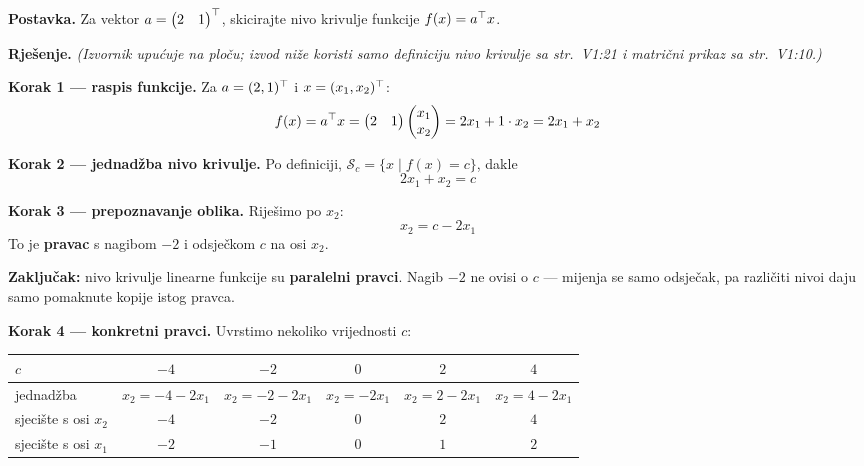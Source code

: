 \begin{zadatak}
\label{zad:nivo-linearna}

\textbf{Postavka.} Za vektor $a = \begin{pmatrix} 2 & 1 \end{pmatrix}^{\top}$,
skicirajte nivo krivulje funkcije $f(x) = a^{\top} x$.

\medskip
\textbf{Rješenje.} \emph{(Izvornik upućuje na ploču; izvod niže koristi samo
definiciju nivo krivulje sa str.\ V1:21 i matrični prikaz sa str.\ V1:10.)}

\textbf{Korak 1 --- raspis funkcije.} Za $a = (2,1)^{\top}$ i $x = (x_1, x_2)^{\top}$:
\[
f(x) = a^{\top} x
= \begin{pmatrix} 2 & 1 \end{pmatrix}\begin{pmatrix} x_1 \\ x_2 \end{pmatrix}
= 2x_1 + 1\cdot x_2 = 2x_1 + x_2
\]

\textbf{Korak 2 --- jednadžba nivo krivulje.} Po definiciji,
$\mathcal{S}_c = \{x \mid f(x) = c\}$, dakle
\[
2x_1 + x_2 = c
\]

\textbf{Korak 3 --- prepoznavanje oblika.} Riješimo po $x_2$:
\[
x_2 = c - 2x_1
\]
To je \textbf{pravac} s nagibom $-2$ i odsječkom $c$ na osi $x_2$.

\textbf{Zaključak:} nivo krivulje linearne funkcije su \textbf{paralelni
pravci}. Nagib $-2$ ne ovisi o $c$ --- mijenja se samo odsječak, pa različiti
nivoi daju samo pomaknute kopije istog pravca.

\textbf{Korak 4 --- konkretni pravci.} Uvrstimo nekoliko vrijednosti $c$:

\begin{center}
\setlength{\tabcolsep}{4pt}
\begin{tabular}{lccccc}
\toprule
$c$ & $-4$ & $-2$ & $0$ & $2$ & $4$ \\
\midrule
jednadžba & \small$x_2 = -4-2x_1$ & \small$x_2 = -2-2x_1$ & \small$x_2 = -2x_1$
          & \small$x_2 = 2-2x_1$ & \small$x_2 = 4-2x_1$ \\
sjecište s osi $x_2$ & $-4$ & $-2$ & $0$ & $2$ & $4$ \\
sjecište s osi $x_1$ & $-2$ & $-1$ & $0$ & $1$ & $2$ \\
\bottomrule
\end{tabular}
\setlength{\tabcolsep}{6pt}
\end{center}


\end{zadatak}
